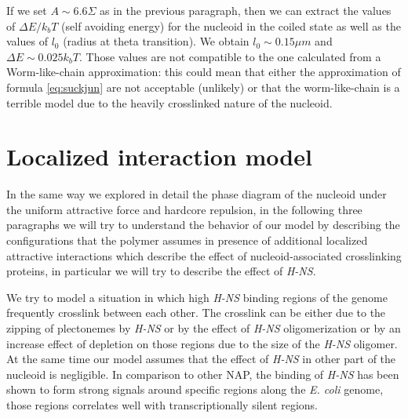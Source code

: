\documentclass[12pt,a4paper,notitlepage]{article}
\newcommand{\hns}{\emph{H-NS}\xspace}
\newcommand{\ecoli}{\emph{E. coli}\xspace}
\begin{document}
If we set $A \sim 6.6 \Sigma$ as in the previous paragraph, then we
can extract the values of $\Delta E / k_b T$ (self avoiding energy) for the
nucleoid in the coiled state as well as the values of $l_0$
(radius at theta transition). We obtain $l_0 \sim 0.15 \mu m$ and 
$\Delta E \sim 0.025 k_b T$. Those values are not compatible to the one
calculated from a Worm-like-chain approximation: this could mean that
either the approximation of formula \ref{eq:suckjun} are not
acceptable (unlikely) or that the worm-like-chain is a terrible model
due to the heavily crosslinked nature of the nucleoid.

\section{Localized interaction model}

In the same way we explored in detail the phase diagram of the
nucleoid under the uniform attractive force and hardcore repulsion, in
the following three paragraphs we will try to understand the behavior of
our model by describing the configurations that the polymer assumes in
presence of additional localized attractive interactions which
describe the effect of nucleoid-associated crosslinking proteins, in
particular we will try to describe the effect of \hns.

We try to model a situation in which high \hns binding
regions of the genome frequently crosslink between each
other. The crosslink can be either due to the zipping of plectonemes
by \hns or by the effect of \hns oligomerization or by an increase
effect of depletion on those regions due to the size of the \hns
oligomer. At the same time our model assumes that the effect of 
\hns in other part of the nucleoid is negligible. In comparison to
other NAP, the binding of \hns has been shown to form strong signals
around specific regions along the \ecoli
genome\cite{Kahramanoglou2011}, those regions correlates well with
transcriptionally silent regions\cite{Vora2009}.
\end{document}
